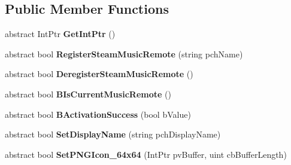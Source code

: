\subsection*{Public Member Functions}
\begin{DoxyCompactItemize}
\item 
\hypertarget{classValve_1_1Steamworks_1_1ISteamMusicRemote_af04f27e138ed4636fdc1e4a0b9ea268d}{}abstract Int\+Ptr {\bfseries Get\+Int\+Ptr} ()\label{classValve_1_1Steamworks_1_1ISteamMusicRemote_af04f27e138ed4636fdc1e4a0b9ea268d}

\item 
\hypertarget{classValve_1_1Steamworks_1_1ISteamMusicRemote_a0b70d8fe4222e3721eb8d596d2d7b995}{}abstract bool {\bfseries Register\+Steam\+Music\+Remote} (string pch\+Name)\label{classValve_1_1Steamworks_1_1ISteamMusicRemote_a0b70d8fe4222e3721eb8d596d2d7b995}

\item 
\hypertarget{classValve_1_1Steamworks_1_1ISteamMusicRemote_a85a1bf32599517eda17dfe00ea2ffb3c}{}abstract bool {\bfseries Deregister\+Steam\+Music\+Remote} ()\label{classValve_1_1Steamworks_1_1ISteamMusicRemote_a85a1bf32599517eda17dfe00ea2ffb3c}

\item 
\hypertarget{classValve_1_1Steamworks_1_1ISteamMusicRemote_aa0478178af54d4315596500e79e6aee8}{}abstract bool {\bfseries B\+Is\+Current\+Music\+Remote} ()\label{classValve_1_1Steamworks_1_1ISteamMusicRemote_aa0478178af54d4315596500e79e6aee8}

\item 
\hypertarget{classValve_1_1Steamworks_1_1ISteamMusicRemote_a54aa7d740d3cfbe27cf0216e8e5b349e}{}abstract bool {\bfseries B\+Activation\+Success} (bool b\+Value)\label{classValve_1_1Steamworks_1_1ISteamMusicRemote_a54aa7d740d3cfbe27cf0216e8e5b349e}

\item 
\hypertarget{classValve_1_1Steamworks_1_1ISteamMusicRemote_ac13a845da239651cbe3d3a59dd058f50}{}abstract bool {\bfseries Set\+Display\+Name} (string pch\+Display\+Name)\label{classValve_1_1Steamworks_1_1ISteamMusicRemote_ac13a845da239651cbe3d3a59dd058f50}

\item 
\hypertarget{classValve_1_1Steamworks_1_1ISteamMusicRemote_a2063023536807bd6bb9afc6788893a38}{}abstract bool {\bfseries Set\+P\+N\+G\+Icon\+\_\+64x64} (Int\+Ptr pv\+Buffer, uint cb\+Buffer\+Length)\label{classValve_1_1Steamworks_1_1ISteamMusicRemote_a2063023536807bd6bb9afc6788893a38}


\end{DoxyCompactItemize}

